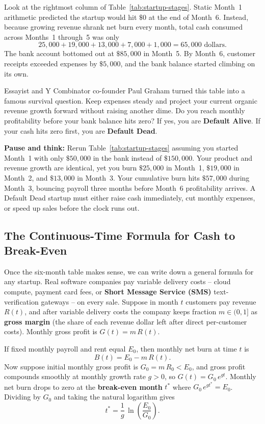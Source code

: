 Look at the rightmost column of Table~\ref{tab:startup-stages}. Static Month~1 arithmetic predicted the startup would hit $\$0$ at the end of Month~6. Instead, because growing revenue shrank net burn every month, total cash consumed across Months~1 through~5 was only
\[
  25{,}000 + 19{,}000 + 13{,}000 + 7{,}000 + 1{,}000 = 65{,}000 \text{ dollars.}
\]
The bank account bottomed out at $\$85{,}000$ in Month~5. By Month~6, customer receipts exceeded expenses by $\$5{,}000$, and the bank balance started climbing on its own.

Essayist and Y Combinator co-founder Paul Graham turned this table into a famous survival question. Keep expenses steady and project your current organic revenue growth forward without raising another dime. Do you reach monthly profitability before your bank balance hits zero? If yes, you are \textbf{Default Alive}. If your cash hits zero first, you are \textbf{Default Dead}.

\begin{recoverybox}
\textbf{Pause and think:} Rerun Table~\ref{tab:startup-stages} assuming you started Month~1 with only $\$50{,}000$ in the bank instead of $\$150{,}000$. Your product and revenue growth are identical, yet you burn $\$25{,}000$ in Month~1, $\$19{,}000$ in Month~2, and $\$13{,}000$ in Month~3. Your cumulative burn hits $\$57{,}000$ during Month~3, bouncing payroll three months before Month~6 profitability arrives. A Default Dead startup must either raise cash immediately, cut monthly expenses, or speed up sales before the clock runs out.
\end{recoverybox}

\subsection{The Continuous-Time Formula for Cash to Break-Even}

Once the six-month table makes sense, we can write down a general formula for any startup. Real software companies pay variable delivery costs -- cloud compute, payment card fees, or \textbf{Short Message Service (SMS)} text-verification gateways -- on every sale. Suppose in month $t$ customers pay revenue $R(t)$, and after variable delivery costs the company keeps fraction $m \in (0, 1]$ as \textbf{gross margin} (the share of each revenue dollar left after direct per-customer costs). Monthly gross profit is $G(t) = m\,R(t)$.

If fixed monthly payroll and rent equal $E_0$, then monthly net burn at time $t$ is
\begin{equation}\label{eq:net-burn}
  B(t) = E_0 - m\,R(t).
\end{equation}
Now suppose initial monthly gross profit is $G_0 = m\,R_0 < E_0$, and gross profit compounds smoothly at monthly growth rate $g > 0$, so $G(t) = G_0\,e^{g t}$. Monthly net burn drops to zero at the \textbf{break-even month} $t^*$ where $G_0\,e^{g t^*} = E_0$. Dividing by $G_0$ and taking the natural logarithm gives
\begin{equation}\label{eq:breakeven-time}
  t^* = \frac{1}{g}\,\ln\!\left(\frac{E_0}{G_0}\right).
\end{equation}

